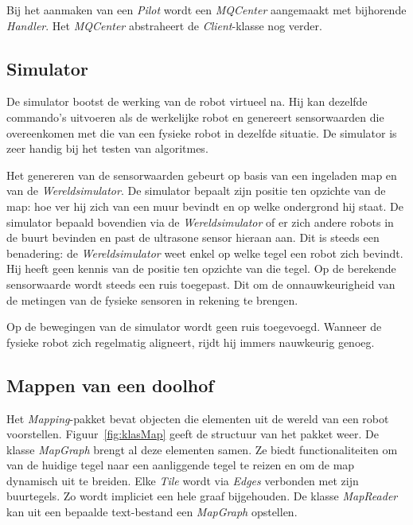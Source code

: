 \documentclass[eind]{penoverslag}
\begin{document}
Bij het aanmaken van een \textit{Pilot} wordt een \textit{MQCenter} aangemaakt met bijhorende \textit{Handler}. Het \textit{MQCenter} abstraheert de \textit{Client}-klasse nog verder.

\subsection{Simulator} 
\label{ssec:Sim}
De simulator bootst de werking van de robot virtueel na.
Hij kan dezelfde commando's uitvoeren als de werkelijke robot en
genereert sensorwaarden die overeenkomen met die van een fysieke
robot in dezelfde situatie. De simulator is zeer handig bij het testen van algoritmes.

Het genereren van de sensorwaarden gebeurt op basis van een ingeladen map en van de \textit{Wereldsimulator}. De simulator bepaalt zijn positie ten opzichte van de map: hoe ver hij zich van een muur bevindt en op welke ondergrond hij staat. De simulator bepaald bovendien via de \textit{Wereldsimulator} of er zich andere robots in de buurt bevinden en past de ultrasone sensor hieraan aan. Dit is steeds een benadering: de \textit{Wereldsimulator} weet enkel op welke tegel een robot zich bevindt. Hij heeft geen kennis van de positie ten opzichte van die tegel. Op de berekende sensorwaarde wordt steeds een ruis toegepast. Dit om de onnauwkeurigheid van de metingen van de fysieke sensoren in rekening te brengen.


Op de bewegingen van de simulator wordt geen ruis toegevoegd.
Wanneer de fysieke robot zich regelmatig aligneert,
rijdt hij immers nauwkeurig genoeg.


\subsection{Mappen van een doolhof}
\label{ssec:Mapping}
Het \textit{Mapping}-pakket bevat objecten die elementen uit de wereld van een robot voorstellen. Figuur~\ref{fig:klasMap} geeft de structuur van het pakket weer. De klasse \textit{MapGraph} brengt al deze elementen samen. Ze biedt functionaliteiten om van de huidige tegel naar een aanliggende tegel te reizen en om de map dynamisch uit te breiden. Elke \textit{Tile} wordt via \textit{Edges} verbonden met zijn buurtegels. Zo wordt impliciet een hele graaf bijgehouden. De klasse \textit{MapReader} kan uit een bepaalde text-bestand een \textit{MapGraph} opstellen.\\
\end{document}
